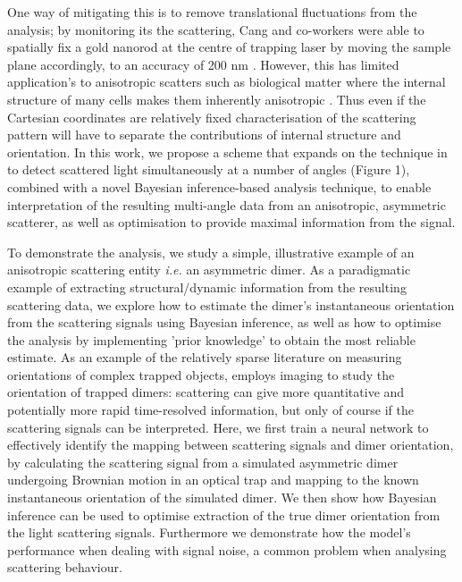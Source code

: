 \documentclass[final,  3p]{elsarticle}
\begin{document}
One way of mitigating this is to remove translational fluctuations from the analysis; by monitoring its the scattering, Cang and co-workers were able to spatially fix a gold nanorod at the centre of trapping laser by moving the sample plane accordingly, to an accuracy of 200 nm \cite{Cang2006}. However, this has limited application's to anisotropic scatters such as biological matter where the internal structure of many cells makes them inherently anisotropic \cite{Watson_2023}. Thus even if the Cartesian coordinates are relatively fixed characterisation of the scattering pattern will have to separate the contributions of internal structure and orientation. In this work, we propose a scheme that expands on the technique in \cite{Bar-Ziv_1998} to detect scattered light simultaneously at a number of angles (Figure 1), combined with a novel Bayesian inference-based analysis technique, to enable interpretation of the resulting multi-angle data from an anisotropic, asymmetric scatterer, as well as optimisation to provide maximal information from the signal. 

To demonstrate the analysis, we study a simple, illustrative example of an anisotropic scattering entity \emph{i.e.} an asymmetric dimer. As a paradigmatic example of extracting structural/dynamic information from the resulting scattering data, we explore how to estimate the dimer's instantaneous orientation from the scattering signals using Bayesian inference, as well as how to optimise the analysis by implementing 'prior knowledge' to obtain the most reliable estimate. As an example of the relatively sparse literature on measuring orientations of complex trapped objects, \cite{raudsepp2022estimating} employs imaging to study the orientation of trapped dimers: scattering can give more quantitative and potentially more rapid time-resolved information, but only of course if the scattering signals can be interpreted. Here, we first train a neural network to effectively identify the mapping between scattering signals and dimer orientation, by calculating the scattering signal from a simulated asymmetric dimer undergoing Brownian motion in an optical trap and mapping to the known instantaneous orientation of the simulated dimer. We then show how Bayesian inference can be used to optimise extraction of the true dimer orientation from the light scattering signals. Furthermore we demonstrate how the model's performance when dealing with signal noise, a common problem when analysing scattering behaviour. 
\end{document}
